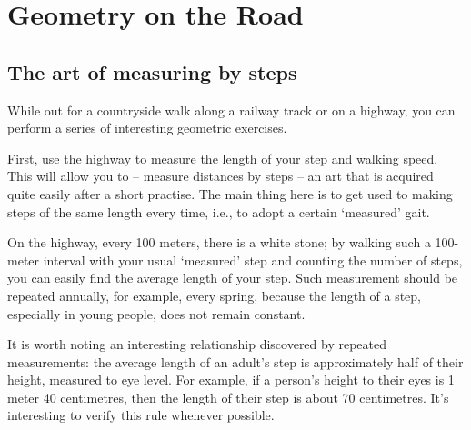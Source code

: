 

\chapter{Geometry on the Road}
\label{ch-04}

\section{The art of measuring by steps}
\label{sec-4.1}


While out for a countryside walk along a railway track or on a highway, you can perform a series of interesting geometric exercises.

First, use the highway to measure the length of your step and walking speed. This will allow you to -- measure distances by steps -- an art that is acquired quite easily after a short practise. The main thing here is to get used to making steps of the same length every time, i.e., to adopt a certain `measured' gait.

On the highway, every 100 meters, there is a white stone; by walking such a 100-meter interval with your usual `measured' step and counting the number of steps, you can easily find the average length of your step. Such measurement should be repeated annually, for example, every spring, because the length of a step, especially in young people, does not remain constant.

It is worth noting an interesting relationship discovered by repeated measurements: the average length of an adult's step is approximately half of their height, measured to eye level. For example, if a person's height to their eyes is 1 meter 40 centimetres, then the length of their step is about 70 centimetres. It's interesting to verify this rule whenever possible.

